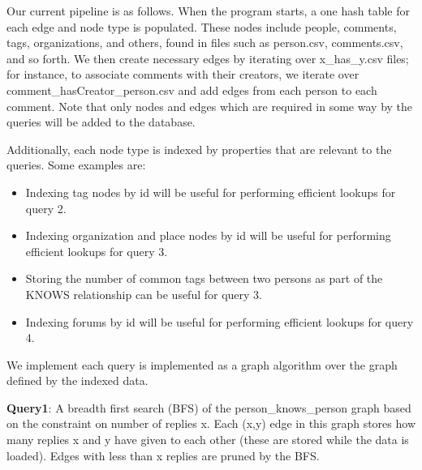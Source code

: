 \documentclass{article}
\begin{document}



Our current pipeline is as follows.  When the program starts, a one
hash table for each edge and node type is populated.  These nodes
include people, comments, tags, organizations, and others, found in
files such as person.csv, comments.csv, and so forth. We then create
necessary edges by iterating over x\_has\_y.csv files; for instance,
to associate comments with their creators, we iterate over
comment\_hasCreator\_person.csv and add edges from each person to each
comment.  Note that only nodes and edges which are required in some
way by the queries will be added to the database.


Additionally, each node type is indexed by properties that are 
relevant to the queries. Some examples are:


\begin{itemize}
\item Indexing tag nodes by id will be useful for performing efficient 
lookups for query 2.
\item Indexing organization and place nodes by id will be useful for 
performing efficient lookups for query 3.
\item Storing the number of common tags between two persons as part of 
the KNOWS relationship can be useful for query 3.
\item Indexing forums by id will be useful for performing efficient lookups 
for query 4.
\end{itemize}

We implement each query is implemented as a graph algorithm over the graph defined
by the indexed data.

\textbf{Query1}: A breadth first search (BFS) of the
person\_knows\_person graph based on the constraint on number of replies
x.  Each (x,y) edge in this graph stores how many replies x and y have
given to each other (these are stored while the data is loaded). Edges
with less than x replies are pruned by the BFS.
\end{document}
